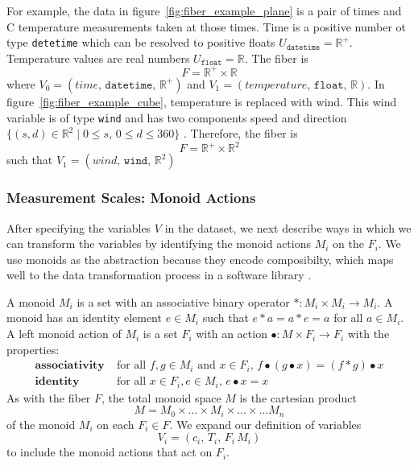 \documentclass[../main.tex]{subfiles}
\begin{document}
For example, the data in figure~\ref{fig:fiber_example_plane} is a pair of times and \textdegree C temperature measurements taken at those times. Time is a positive number ot type \texttt{detetime} which can be resolved to positive floats $U_{\texttt{datetime}}= \mathbb{R}^+$. Temperature values are real numbers $U_{\texttt{float}} = \mathbb{R}$. The fiber is 
\begin{equation}
    F =  \mathbb{R}^{+} \times \mathbb{R} 
\end{equation} 
where $V_0 = (time,\, \texttt{datetime},\, \mathbb{R}^+)$ and $V_1 = (temperature,\, \texttt{float},\, \mathbb{R})$. In figure~\ref{fig:fiber_example_cube}, temperature is replaced with wind. This wind variable is of type \texttt{wind} and has two components speed and direction $\{(s,d) \in \mathbb{R}^{2} \mid  0\leq s,\, 0 \leq d \leq 360\}$ . Therefore, the fiber is 
\begin{equation}
    F = \mathbb{R}^{+} \times \mathbb{R}^2
\end{equation} 
such that $V_1 = (wind,\, \texttt{wind},\, \mathbb{R}^{2})$  

\subsubsection{Measurement Scales: Monoid Actions}
\label{sec:data_monoid}
After specifying the variables $V$ in the dataset, we next describe ways in which we can transform the variables by identifying the monoid actions $M_i$ on the $F_i$. We use monoids as the abstraction because they encode composibilty, which maps well to the data transformation process in a software library \cite{yorgeyMonoidsThemeVariations}. 

A monoid \cite{Monoid2021} $M_i$ is a set with an associative binary operator $\ast:M_i \times M_i\rightarrow M_i$. A monoid has an identity element $e\in M_i$ such that $e\ast a= a \ast e = a$ for all $a \in M_i$. A left monoid action \cite{SemigroupAction2021,ActionNLab} of $M_i$ is a set $F_i$ with an action $\bullet: M\times F_i \rightarrow F_i$ with the properties:
\begin{align*}
    \textbf{associativity}\;& \text{for all } f,g \in M_i \text{ and } x\in F_i,\, f\bullet(g\bullet x) = (f\ast g) \bullet x\\
    \textbf{identity}\;& \text{for all } x\in F_i, e\in M_i,\,  e\bullet x = x 
\end{align*}
As with the fiber $F$, the total monoid space $M$ is the cartesian product
\begin{equation}
M = M_{0} \times \ldots \times M_{i}\times \ldots \times\ldots M_{n}
\end{equation}
of the monoid $M_{i}$ on each $F_{i}\in F$. We expand our definition of variables 
\begin{equation}
        V_i = (c_i,\, T_i,\, F_i\, M_i)
\end{equation}
to include the monoid actions that act on $F_i$. 
\end{document}
